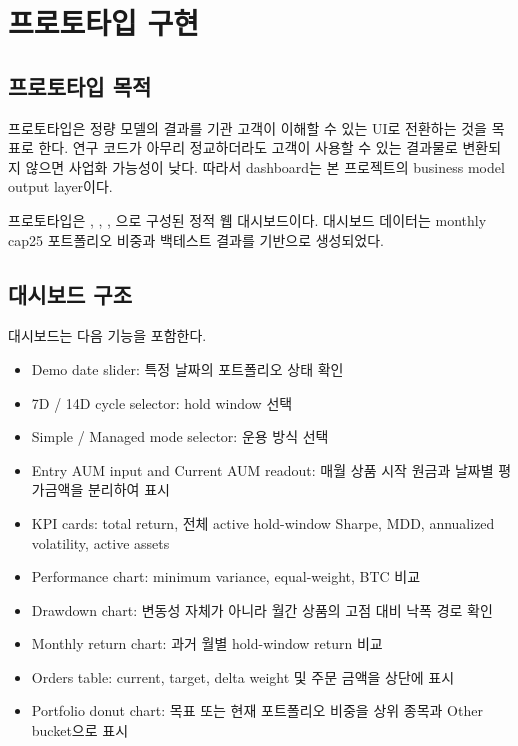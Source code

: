 \documentclass[12pt,a4paper]{article}
\begin{document}


\section{프로토타입 구현}

\subsection{프로토타입 목적}

프로토타입은 정량 모델의 결과를 기관 고객이 이해할 수 있는 UI로 전환하는 것을 목표로 한다. 연구 코드가 아무리 정교하더라도 고객이 사용할 수 있는 결과물로 변환되지 않으면 사업화 가능성이 낮다. 따라서 dashboard는 본 프로젝트의 business model output layer이다.

프로토타입은 \texttt{}, \texttt{}, \texttt{}, \texttt{}으로 구성된 정적 웹 대시보드이다. 대시보드 데이터는 monthly cap25 포트폴리오 비중과 백테스트 결과를 기반으로 생성되었다.

\subsection{대시보드 구조}

대시보드는 다음 기능을 포함한다.

\begin{itemize}
\item Demo date slider: 특정 날짜의 포트폴리오 상태 확인
\item 7D / 14D cycle selector: hold window 선택
\item Simple / Managed mode selector: 운용 방식 선택
\item Entry AUM input and Current AUM readout: 매월 상품 시작 원금과 날짜별 평가금액을 분리하여 표시
\item KPI cards: total return, 전체 active hold-window Sharpe, MDD, annualized volatility, active assets
\item Performance chart: minimum variance, equal-weight, BTC 비교
\item Drawdown chart: 변동성 자체가 아니라 월간 상품의 고점 대비 낙폭 경로 확인
\item Monthly return chart: 과거 월별 hold-window return 비교
\item Orders table: current, target, delta weight 및 주문 금액을 상단에 표시
\item Portfolio donut chart: 목표 또는 현재 포트폴리오 비중을 상위 종목과 Other bucket으로 표시
\end{itemize}
\end{document}
